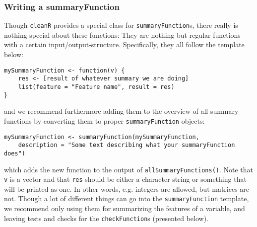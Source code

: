 \documentclass[article]{jss}
\newcommand{\R}[1]{\texttt{#1}}
\begin{document}
\subsubsection{Writing a summaryFunction}
Though \R{cleanR} provides a special class for \R{summaryFunction}s, there really is nothing special about these functions: They are nothing but regular functions with a certain input/output-structure. Specifically, they all follow the template below:
\begin{Verbatim}
mySummaryFunction <- function(v) {
	res <- [result of whatever summary we are doing]
	list(feature = "Feature name", result = res)
}
\end{Verbatim}
and we recommend furthermore adding them to the overview of all summary functions by converting them to proper \R{summaryFunction} objects:
\begin{Verbatim}
mySummaryFunction <- summaryFunction(mySummaryFunction,
	description = "Some text describing what your summaryFunction does")
\end{Verbatim}
which adds the new function to the output of \R{allSummaryFunctions()}. Note that \R{v} is a vector and that \R{res} should be either a character string or something that will be printed as one. In other words, e.g. integers are allowed, but matrices are not. Though a lot of different things can go into the \R{summaryFunction} template, we recommend only using them for summarizing the features of a variable, and leaving tests and checks for the \R{checkFunction}s (presented below).
\end{document}

